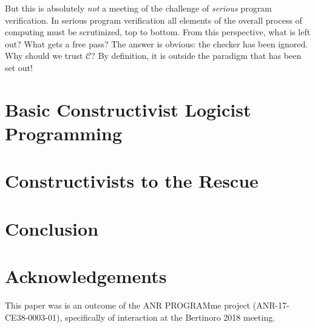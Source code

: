 \documentclass[11pt]{article}
\begin{document}
    But this is absolutely \emph{not} a meeting of the challenge of
    \emph{serious} program verification.  In serious program
    verification all elements of the overall process of computing must
    be scrutinized, top to bottom.  From this perspective, what is
    left out?  What gets a free pass?  The answer is obvious: the
    checker has been ignored.  Why should we trust $\mathcal{C}$?  By
    definition, it is outside the paradigm that has been set out!



  \section{Basic Constructivist Logicist Programming}
  \label{sect:basic_constructivist}



  \section{Constructivists to the Rescue}
  \label{sect:rescue}



  \section{Conclusion}
  \label{sect:conclusion}



  \section{Acknowledgements}
  \label{sect:ack}
 
  This paper was is an outcome of the ANR PROGRAMme project
  (ANR-17-CE38-0003-01), specifically of interaction at the Bertinoro
  2018 meeting.

  

  
  \begin{small}
    
  \end{small}
\end{document}
